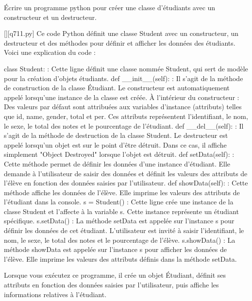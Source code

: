         \question
        Écrire un programme python pour créer une classe d'étudiants avec un constructeur et un destructeur.
        \par
        \begin{solution}
            \renewcommand{\nomfichier}{q711.py}
            \pythonfile{\chemincode \nomfichier}[][\nomfichier]
            Ce code Python définit une classe Student avec un constructeur, un destructeur et des méthodes pour définir et afficher les données des étudiants. Voici une explication du code :

    class Student: : Cette ligne définit une classe nommée Student, qui sert de modèle pour la création d'objets étudiants.
    def __init__(self): : Il s'agit de la méthode de construction de la classe Étudiant. Le constructeur est automatiquement appelé lorsqu'une instance de la classe est créée. À l'intérieur du constructeur :
        Des valeurs par défaut sont attribuées aux variables d'instance (attributs) telles que id, name, gender, total et per.
        Ces attributs représentent l'identifiant, le nom, le sexe, le total des notes et le pourcentage de l'étudiant.
    def __del__(self): : Il s'agit de la méthode de destruction de la classe Student. Le destructeur est appelé lorsqu'un objet est sur le point d'être détruit. Dans ce cas, il affiche simplement "Object Destroyed" lorsque l'objet est détruit.
    def setData(self): : Cette méthode permet de définir les données d'une instance d'étudiant. Elle demande à l'utilisateur de saisir des données et définit les valeurs des attributs de l'élève en fonction des données saisies par l'utilisateur.
    def showData(self): : Cette méthode affiche les données de l'élève. Elle imprime les valeurs des attributs de l'étudiant dans la console.
    s = Student() : Cette ligne crée une instance de la classe Student et l'affecte à la variable s. Cette instance représente un étudiant spécifique.
    s.setData() : La méthode setData est appelée sur l'instance s pour définir les données de cet étudiant. L'utilisateur est invité à saisir l'identifiant, le nom, le sexe, le total des notes et le pourcentage de l'élève.
    s.showData() : La méthode showData est appelée sur l'instance s pour afficher les données de l'élève. Elle imprime les valeurs des attributs définis dans la méthode setData.

Lorsque vous exécutez ce programme, il crée un objet Étudiant, définit ses attributs en fonction des données saisies par l'utilisateur, puis affiche les informations relatives à l'étudiant.
        \end{solution}
        


